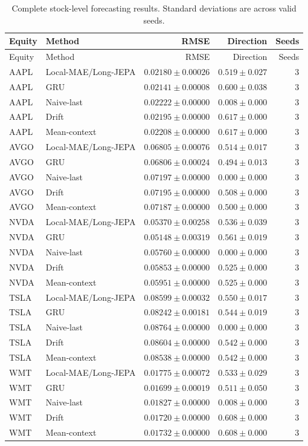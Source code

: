 \begin{longtable}{llrrr}
\caption{Complete stock-level forecasting results. Standard deviations are across valid seeds.}\label{tab:appendix_stock_metrics}\\
\toprule
Equity & Method & RMSE & Direction & Seeds \\
\midrule
\endfirsthead
\toprule
Equity & Method & RMSE & Direction & Seeds \\
\midrule
\endhead
AAPL & Local-MAE/Long-JEPA & $0.02180 \pm 0.00026$ & $0.519 \pm 0.027$ & 3 \\
AAPL & GRU & $0.02141 \pm 0.00008$ & $0.600 \pm 0.038$ & 3 \\
AAPL & Naive-last & $0.02222 \pm 0.00000$ & $0.008 \pm 0.000$ & 3 \\
AAPL & Drift & $0.02195 \pm 0.00000$ & $0.617 \pm 0.000$ & 3 \\
AAPL & Mean-context & $0.02208 \pm 0.00000$ & $0.617 \pm 0.000$ & 3 \\
AVGO & Local-MAE/Long-JEPA & $0.06805 \pm 0.00076$ & $0.514 \pm 0.017$ & 3 \\
AVGO & GRU & $0.06806 \pm 0.00024$ & $0.494 \pm 0.013$ & 3 \\
AVGO & Naive-last & $0.07197 \pm 0.00000$ & $0.000 \pm 0.000$ & 3 \\
AVGO & Drift & $0.07195 \pm 0.00000$ & $0.508 \pm 0.000$ & 3 \\
AVGO & Mean-context & $0.07187 \pm 0.00000$ & $0.500 \pm 0.000$ & 3 \\
NVDA & Local-MAE/Long-JEPA & $0.05370 \pm 0.00258$ & $0.536 \pm 0.039$ & 3 \\
NVDA & GRU & $0.05148 \pm 0.00319$ & $0.561 \pm 0.019$ & 3 \\
NVDA & Naive-last & $0.05760 \pm 0.00000$ & $0.000 \pm 0.000$ & 3 \\
NVDA & Drift & $0.05853 \pm 0.00000$ & $0.525 \pm 0.000$ & 3 \\
NVDA & Mean-context & $0.05951 \pm 0.00000$ & $0.525 \pm 0.000$ & 3 \\
TSLA & Local-MAE/Long-JEPA & $0.08599 \pm 0.00032$ & $0.550 \pm 0.017$ & 3 \\
TSLA & GRU & $0.08242 \pm 0.00181$ & $0.544 \pm 0.019$ & 3 \\
TSLA & Naive-last & $0.08764 \pm 0.00000$ & $0.000 \pm 0.000$ & 3 \\
TSLA & Drift & $0.08604 \pm 0.00000$ & $0.542 \pm 0.000$ & 3 \\
TSLA & Mean-context & $0.08538 \pm 0.00000$ & $0.542 \pm 0.000$ & 3 \\
WMT & Local-MAE/Long-JEPA & $0.01775 \pm 0.00072$ & $0.533 \pm 0.029$ & 3 \\
WMT & GRU & $0.01699 \pm 0.00019$ & $0.511 \pm 0.050$ & 3 \\
WMT & Naive-last & $0.01827 \pm 0.00000$ & $0.008 \pm 0.000$ & 3 \\
WMT & Drift & $0.01720 \pm 0.00000$ & $0.608 \pm 0.000$ & 3 \\
WMT & Mean-context & $0.01732 \pm 0.00000$ & $0.608 \pm 0.000$ & 3 \\
\bottomrule
\end{longtable}
